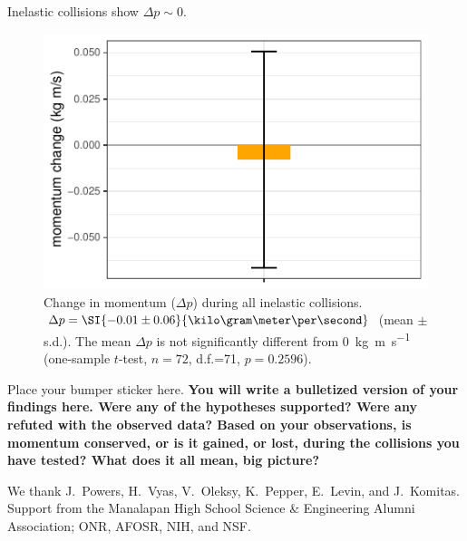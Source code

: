 \documentclass[pdf,serif]{beamer}
\begin{document}
\begin{frame}{}
\begin{columns}[T,totalwidth=\textwidth]
\begin{column}{14.33in}
\begin{minipage}[t][\textheight]{\linewidth}
\begin{block}{Inelastic collisions show $\Delta p\sim 0$.}
\begin{figure}
\begin{center}
\includegraphics[width=0.8\columnwidth]{momentum-change.pdf}
\end{center}
\caption{Change in momentum ($\Delta p$) during all inelastic collisions. $\Delta p = \SI{-0.01\pm0.06}{\kilo\gram\meter\per\second}$ (mean $\pm$ s.d.). The mean $\Delta p$ is not significantly different from \SI{0}{\kilo\gram\meter\per\second} (one-sample $t$-test, $n=72$, d.f.=71, $p=0.2596$).}
\label{fig:results2}
\end{figure}
\end{block}
\vfill
\begin{block}{Place your bumper sticker here.}
\textbf{You will write a bulletized version of your findings here.  Were any of the hypotheses supported? Were any refuted with the observed data? Based on your observations, is momentum conserved, or is it gained, or lost, during the collisions you have tested? What does it all mean, big picture?}
\end{block}
\vspace{1.25in}
\begin{block}{} %
We thank J.~Powers, H.~Vyas, V.~Oleksy, K.~Pepper, E.~Levin, and J.~Komitas. Support from the Manalapan High School Science \& Engineering Alumni Association; ONR, AFOSR, NIH, and NSF.
\end{block}
\vfill*
\end{minipage}
\end{column}
\end{columns}
\end{frame}
\end{document}
